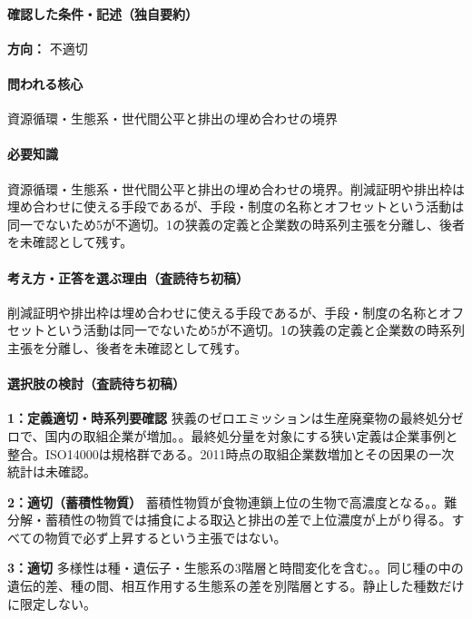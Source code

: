\paragraph{確認した条件・記述（独自要約）}\mbox{}\par

\noindent\textbf{方向：} 不適切\par

\paragraph{問われる核心} 資源循環・生態系・世代間公平と排出の埋め合わせの境界

\paragraph{必要知識} 資源循環・生態系・世代間公平と排出の埋め合わせの境界。削減証明や排出枠は埋め合わせに使える手段であるが、手段・制度の名称とオフセットという活動は同一でないため5が不適切。1の狭義の定義と企業数の時系列主張を分離し、後者を未確認として残す。

\paragraph{考え方・正答を選ぶ理由（査読待ち初稿）} 削減証明や排出枠は埋め合わせに使える手段であるが、手段・制度の名称とオフセットという活動は同一でないため5が不適切。1の狭義の定義と企業数の時系列主張を分離し、後者を未確認として残す。

\paragraph{選択肢の検討（査読待ち初稿）}\mbox{}\par

\noindent\textbf{1：定義適切・時系列要確認} 狭義のゼロエミッションは生産廃棄物の最終処分ゼロで、国内の取組企業が増加。。最終処分量を対象にする狭い定義は企業事例と整合。ISO14000は規格群である。2011時点の取組企業数増加とその因果の一次統計は未確認。\par

\noindent\textbf{2：適切（蓄積性物質）} 蓄積性物質が食物連鎖上位の生物で高濃度となる。。難分解・蓄積性の物質では捕食による取込と排出の差で上位濃度が上がり得る。すべての物質で必ず上昇するという主張ではない。\par

\noindent\textbf{3：適切} 多様性は種・遺伝子・生態系の3階層と時間変化を含む。。同じ種の中の遺伝的差、種の間、相互作用する生態系の差を別階層とする。静止した種数だけに限定しない。\par

